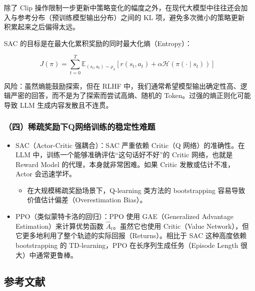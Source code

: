 除了 Clip 操作限制一步更新中策略变化的幅度之外，在现代大模型中往往还会加入与参考分布（预训练模型输出分布）之间的 KL 项，避免多次微小的策略更新积累起来之后偏得太远。

SAC 的目标是在最大化累积奖励的同时最大化熵（Entropy）：

\[
J(\pi)
=
\sum_{t=0}^{T}
\mathbb{E}_{(s_t,a_t)\sim\rho_\pi}
\left[
r(s_t,a_t)
+\alpha\mathcal{H}(\pi(\cdot\mid s_t))
\right]
\]

风险：虽然熵能鼓励探索，但在 RLHF 中，我们通常希望模型输出确定性高、逻辑严密的回答，而不是为了探索而尝试高熵、随机的 Token。过强的熵正则化可能导致 LLM 生成内容发散且不连贯。

\hypertarget{ux56dbux7a00ux758fux5956ux52b1ux4e0bqux7f51ux7edcux8badux7ec3ux7684ux7a33ux5b9aux6027ux96beux9898}{%
\subsubsection{（四）稀疏奖励下Q网络训练的稳定性难题}\label{ux56dbux7a00ux758fux5956ux52b1ux4e0bqux7f51ux7edcux8badux7ec3ux7684ux7a33ux5b9aux6027ux96beux9898}}

\begin{itemize}
\tightlist
\item
  SAC（Actor-Critic 强耦合）：SAC 严重依赖 Critic（Q 网络）的准确性。在 LLM 中，训练一个能够准确评估``这句话好不好''的 Critic 网络，也就是 Reward Model 的代理，本身就非常困难。如果 Critic 发散或估计不准，Actor 会迅速学坏。

  \begin{itemize}
  \tightlist
  \item
    在大规模稀疏奖励场景下，Q-learning 类方法的 bootstrapping 容易导致价值估计偏差（Overestimation Bias）。
  \end{itemize}
\item
  PPO（类似蒙特卡洛的回归）：PPO 使用 GAE（Generalized Advantage Estimation）来计算优势函数 \(\hat{A}_t\)。虽然它也使用 Critic（Value Network），但它更多地利用了整个轨迹的实际回报（Returns）。相比于 SAC 这种高度依赖 bootstrapping 的 TD-learning，PPO 在长序列生成任务（Episode Length 很大）中通常更鲁棒。
\end{itemize}

\hypertarget{ux53c2ux8003ux6587ux732e-84}{%
\subsection{参考文献}\label{ux53c2ux8003ux6587ux732e-84}}

